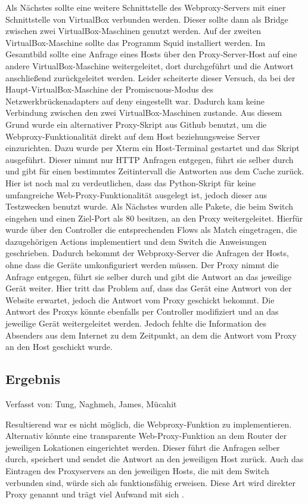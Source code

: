 \documentclass[fontsize=12pt,paper=a4,open=any,parskip=half,
  twoside=false,toc=listof,toc=bibliography,fleqn,leqno,
  captions=nooneline,captions=tableabove,british]{scrbook}
\begin{document}
Als Nächstes sollte eine weitere Schnittstelle des Webproxy-Servers mit einer Schnittstelle von VirtualBox verbunden werden. Dieser sollte dann als Bridge zwischen zwei VirtualBox-Maschinen genutzt werden. Auf der zweiten VirtualBox-Maschine sollte das Programm Squid installiert werden. Im Gesamtbild sollte eine Anfrage eines Hosts über den Proxy-Server-Host auf eine andere VirtualBox-Maschine weitergeleitet, dort durchgeführt und die Antwort anschließend zurückgeleitet werden. Leider scheiterte dieser Versuch, da bei der Haupt-VirtualBox-Maschine der Promiscuous-Modus des Netzwerkbrückenadapters auf deny eingestellt war. Dadurch kam keine Verbindung zwischen den zwei VirtualBox-Maschinen zustande. Aus diesem Grund wurde ein alternativer Proxy-Skript aus Github benutzt, um die Webproxy-Funktionalität direkt auf dem Host beziehungsweise Server einzurichten. Dazu wurde per Xterm ein Host-Terminal gestartet und das Skript ausgeführt. Dieser nimmt nur HTTP Anfragen entgegen, führt sie selber durch und gibt für einen bestimmtes Zeitintervall die Antworten aus dem Cache zurück. Hier ist noch mal zu verdeutlichen, dass das Python-Skript für keine umfangreiche Web-Proxy-Funktionalität ausgelegt ist, jedoch dieser aus Testzwecken benutzt wurde. Als Nächstes wurden alle Pakete, die beim Switch eingehen und einen Ziel-Port als 80 besitzen, an den Proxy weitergeleitet. Hierfür wurde über den Controller die entsprechenden Flows als Match eingetragen, die dazugehörigen Actions implementiert und dem Switch die Anweisungen geschrieben. Dadurch bekommt der Webproxy-Server die Anfragen der Hosts, ohne dass die Geräte umkonfiguriert werden müssen. Der Proxy nimmt die Anfrage entgegen, führt sie selber durch und gibt die Antwort an das jeweilige Gerät weiter. Hier tritt das Problem auf, dass das Gerät eine Antwort von der Website erwartet, jedoch die Antwort vom Proxy geschickt bekommt. Die Antwort des Proxys könnte ebenfalls per Controller modifiziert und an das jeweilige Gerät weitergeleitet werden. Jedoch fehlte die Information des Absenders aus dem Internet zu dem Zeitpunkt, an dem die Antwort vom Proxy an den Host geschickt wurde.

\subsection{Ergebnis}
{\tiny Verfasst von: Tung, Naghmeh, James, Mücahit\par}
Resultierend war es nicht möglich, die Webproxy-Funktion zu implementieren. Alternativ könnte eine transparente Web-Proxy-Funktion an dem Router der jeweiligen Lokationen eingerichtet werden. Dieser führt die Anfragen selber durch, speichert und sendet die Antwort an den jeweiligen Host zurück. Auch das Eintragen des Proxyservers an den jeweiligen Hosts, die mit dem Switch verbunden sind, würde sich als funktionsfähig erweisen. Diese Art wird direkter Proxy genannt und trägt viel Aufwand mit sich \cite{webproxy}.
\end{document}
